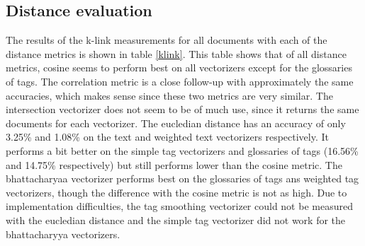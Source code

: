 \subsection{Distance evaluation}
The results of the k-link measurements for all documents with each of the distance metrics is shown in table \ref{klink}. This table shows that of all distance metrics, cosine seems to perform best on all vectorizers except for the glossaries of tags. The correlation metric is a close follow-up with approximately the same accuracies, which makes sense since these two metrics are very similar. The intersection vectorizer does not seem to be of much use, since it returns the same documents for each vectorizer. The eucledian distance has an accuracy of only 3.25\% and 1.08\% on the text and weighted text vectorizers respectively. It performs a bit better on the simple tag vectorizers and glossaries of tags (16.56\% and 14.75\% respectively) but still performs lower than the cosine metric. The bhattacharyaa vectorizer performs best on the glossaries of tags ans weighted tag vectorizers, though the difference with the cosine metric is not as high. Due to implementation difficulties, the tag smoothing vectorizer could not be measured with the eucledian distance and the simple tag vectorizer did not work for the bhattacharyya vectorizers.

